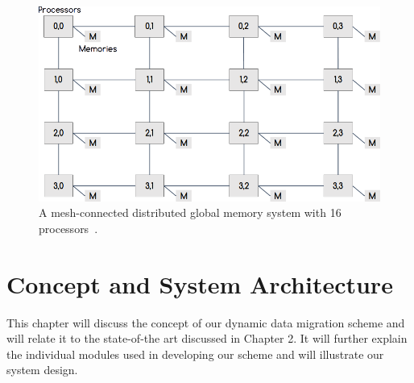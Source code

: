 \documentclass{listhesis}
\begin{document}
\begin{figure}
  \includegraphics[width=0.7\linewidth]{meshconnected.png}
  \centering
  \caption{A mesh-connected distributed global memory system with 16 processors~\cite{dynamicPageMigration}.}
  \label{fig:mesh}
\end{figure}
\chapter{Concept and System Architecture}
This chapter will discuss the concept of our dynamic data migration scheme and will relate it to the state-of-the art discussed in Chapter 2. It will further explain the individual modules used in developing our scheme and will illustrate our system design.
\end{document}
